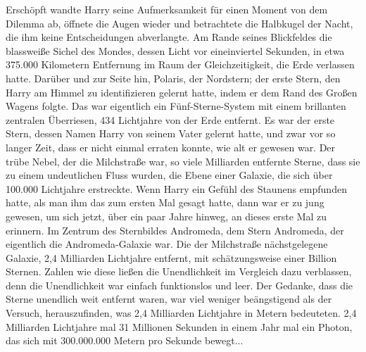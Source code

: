 Erschöpft wandte Harry seine Aufmerksamkeit für einen Moment von dem Dilemma ab,
öffnete die Augen wieder und betrachtete die Halbkugel der Nacht, die ihm keine
Entscheidungen abverlangte. Am Rande seines Blickfeldes die blassweiße Sichel
des Mondes, dessen Licht vor eineinviertel Sekunden, in etwa 375.000 Kilometern
Entfernung im Raum der Gleichzeitigkeit, die Erde verlassen hatte. Darüber und
zur Seite hin, Polaris, der Nordstern; der erste Stern, den Harry am Himmel zu
identifizieren gelernt hatte, indem er dem Rand des Großen Wagens folgte. Das
war eigentlich ein Fünf-Sterne-System mit einem brillanten zentralen Überriesen,
434 Lichtjahre von der Erde entfernt. Es war der erste \glqq Stern\grqq{},
dessen Namen Harry von seinem Vater gelernt hatte, und zwar vor so langer Zeit,
dass er nicht einmal erraten konnte, wie alt er gewesen war. Der trübe Nebel,
der die Milchstraße war, so viele Milliarden entfernte Sterne, dass sie zu einem
undeutlichen Fluss wurden, die Ebene einer Galaxie, die sich über 100.000
Lichtjahre erstreckte. Wenn Harry ein Gefühl des Staunens empfunden hatte, als
man ihm das zum ersten Mal gesagt hatte, dann war er zu jung gewesen, um sich
jetzt, über ein paar Jahre hinweg, an dieses erste Mal zu erinnern. Im Zentrum
des Sternbildes Andromeda, dem Stern Andromeda, der eigentlich die
Andromeda-Galaxie war. Die der Milchstraße nächstgelegene Galaxie, 2,4
Milliarden Lichtjahre entfernt, mit schätzungsweise einer Billion Sternen.
Zahlen wie diese ließen die \glqq Unendlichkeit\grqq{} im Vergleich dazu
verblassen, denn die \glqq Unendlichkeit\grqq{} war einfach funktionslos und
leer. Der Gedanke, dass die Sterne \glqq unendlich\grqq{} weit entfernt waren,
war viel weniger beängstigend als der Versuch, herauszufinden, was 2,4
Milliarden Lichtjahre in Metern bedeuteten. 2,4 Milliarden Lichtjahre mal 31
Millionen Sekunden in einem Jahr mal ein Photon, das sich mit 300.000.000 Metern
pro Sekunde bewegt...

